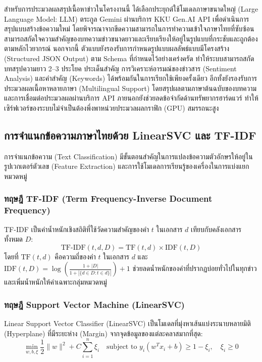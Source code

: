 สำหรับการประมวลผลสรุปเนื้อหาข่าวในโครงงานนี้ ได้เลือกประยุกต์ใช้โมเดลภาษาขนาดใหญ่ (Large Language Model: LLM) ตระกูล Gemini ผ่านบริการ KKU Gen.AI API \cite{gemini2024} เพื่อดำเนินการสรุปแบบสร้างข้อความใหม่ โดยพิจารณาจากขีดความสามารถในการทำความเข้าใจภาษาไทยที่ซับซ้อน สามารถสกัดใจความสำคัญของบทความข่าวขนาดยาวและเรียบเรียงให้อยู่ในรูปแบบที่กระชับและถูกต้องตามหลักไวยากรณ์ นอกจากนี้ ตัวแบบยังรองรับการกำหนดรูปแบบผลลัพธ์แบบมีโครงสร้าง (Structured JSON Output) ตาม Schema ที่กำหนดไว้อย่างเคร่งครัด ทำให้ระบบสามารถสกัดบทสรุปความยาว 2--3 ประโยค ประเด็นสำคัญ การวิเคราะห์อารมณ์ของข่าวสาร (Sentiment Analysis) และคำสำคัญ (Keywords) ได้พร้อมกันในการเรียกใช้เพียงครั้งเดียว อีกทั้งยังรองรับการประมวลผลเนื้อหาหลายภาษา (Multilingual Support) โดยสรุปผลตามภาษาต้นฉบับของบทความ และการเชื่อมต่อประมวลผลผ่านบริการ API ภายนอกยังช่วยลดข้อจำกัดด้านทรัพยากรฮาร์ดแวร์ ทำให้เซิร์ฟเวอร์ของระบบไม่จำเป็นต้องพึ่งพาหน่วยประมวลผลกราฟิก (GPU) สมรรถนะสูง

\subsection{การจำแนกข้อความภาษาไทยด้วย LinearSVC และ TF-IDF}

การจำแนกข้อความ (Text Classification) มีขั้นตอนสำคัญในการแปลงข้อความตัวอักษรให้อยู่ในรูปเวกเตอร์ตัวเลข (Feature Extraction) และการใช้โมเดลการเรียนรู้ของเครื่องในการแบ่งแยกหมวดหมู่

\subsubsection{ทฤษฎี TF-IDF (Term Frequency-Inverse Document Frequency)}
TF-IDF เป็นค่าน้ำหนักเชิงสถิติที่ใช้วัดความสำคัญของคำ $t$ ในเอกสาร $d$ เทียบกับคลังเอกสารทั้งหมด $D$:
\begin{equation}
\text{TF-IDF}(t, d, D) = \text{TF}(t, d) \times \text{IDF}(t, D)
\end{equation}
โดยที่ $\text{TF}(t, d)$ คือความถี่ของคำ $t$ ในเอกสาร $d$ และ $\text{IDF}(t, D) = \log\left(\frac{1 + |D|}{1 + |\{d \in D : t \in d\}|}\right) + 1$ ช่วยลดน้ำหนักของคำที่ปรากฏบ่อยทั่วไปในทุกข่าว และเพิ่มน้ำหนักให้คำเฉพาะกลุ่มหมวดหมู่

\subsubsection{ทฤษฎี Support Vector Machine (LinearSVC)}
Linear Support Vector Classifier (LinearSVC) เป็นโมเดลที่มุ่งหาเส้นแบ่งระนาบหลายมิติ (Hyperplane) ที่มีระยะห่าง (Margin) จากจุดข้อมูลของแต่ละคลาสมากที่สุด:
\begin{equation}
\min_{w, b, \xi} \frac{1}{2} \|w\|^2 + C \sum_{i=1}^n \xi_i \quad \text{subject to } y_i (w^T x_i + b) \ge 1 - \xi_i, \quad \xi_i \ge 0
\end{equation}


